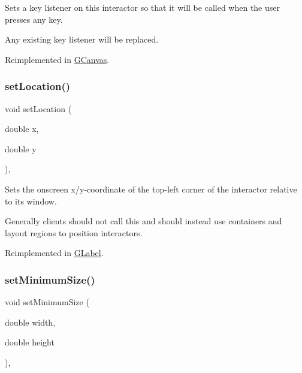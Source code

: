 Sets a key listener on this interactor so that it will be called when the user presses any key. 

Any existing key listener will be replaced. 

Reimplemented in \mbox{\hyperlink{classGCanvas_a1320ed9889a730dfead04a334463ecf3}{G\+Canvas}}.

\mbox{\label{classGInteractor_a04594e8ba9b98513a64f1da00dcae18c}} 
\subsubsection{\texorpdfstring{set\+Location()}{setLocation()}}
{\footnotesize\ttfamily void set\+Location (\begin{DoxyParamCaption}\item[{double}]{x,  }\item[{double}]{y }\end{DoxyParamCaption})\hspace{0.3cm}{\ttfamily [virtual]}, {\ttfamily [inherited]}}



Sets the onscreen x/y-\/coordinate of the top-\/left corner of the interactor relative to its window. 

Generally clients should not call this and should instead use containers and layout regions to position interactors. 

Reimplemented in \mbox{\hyperlink{classGLabel_ae3b17c0aeb355dc23c4e4cbf066e81f7}{G\+Label}}.

\mbox{\label{classGInteractor_a0cf428e207b7f22cc08138a90b1b87b2}} 
\subsubsection{\texorpdfstring{set\+Minimum\+Size()}{setMinimumSize()}\hspace{0.1cm}{\footnotesize\ttfamily [1/2]}}
{\footnotesize\ttfamily void set\+Minimum\+Size (\begin{DoxyParamCaption}\item[{double}]{width,  }\item[{double}]{height }\end{DoxyParamCaption})\hspace{0.3cm}{\ttfamily [virtual]}, {\ttfamily [inherited]}}



